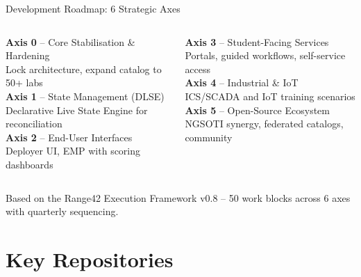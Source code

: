 \documentclass[aspectratio=169]{beamer}
\begin{document}
\begin{frame}{Development Roadmap: 6 Strategic Axes \; \faRoad}
  \small
  \begin{columns}[T]
    \textbf{Axis 0} -- Core Stabilisation \& Hardening\\
    {\footnotesize Lock architecture, expand catalog to 50+ labs}\\[2mm]
    \textbf{Axis 1} -- State Management (DLSE)\\
    {\footnotesize Declarative Live State Engine for reconciliation}\\[2mm]
    \textbf{Axis 2} -- End-User Interfaces\\
    {\footnotesize Deployer UI, EMP with scoring dashboards}

    \textbf{Axis 3} -- Student-Facing Services\\
    {\footnotesize Portals, guided workflows, self-service access}\\[2mm]
    \textbf{Axis 4} -- Industrial \& IoT\\
    {\footnotesize ICS/SCADA and IoT training scenarios}\\[2mm]
    \textbf{Axis 5} -- Open-Source Ecosystem\\
    {\footnotesize NGSOTI synergy, federated catalogs, community}
  \end{columns}
  \vspace{3mm}
  \begin{tcolorbox}
    \faInfoCircle\; Based on the Range42 Execution Framework v0.8 -- 50 work blocks across 6 axes with quarterly sequencing.
  \end{tcolorbox}
\end{frame}

\section{Key Repositories}
\end{document}
